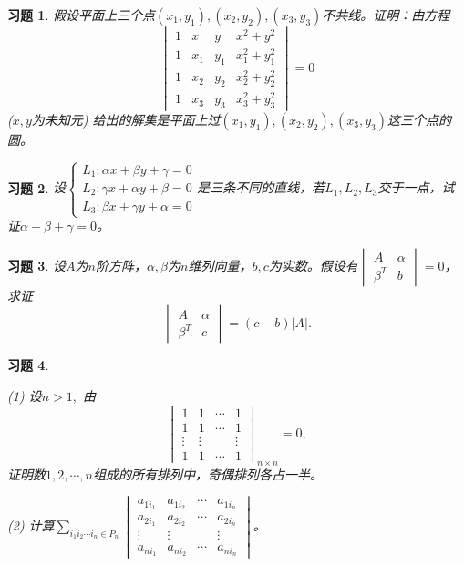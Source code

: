\documentclass[a4paper]{book}
\newtheorem{ex}{习题}[chapter]
\newcommand{\enum}{\begin{list}{}{\setlength{\leftmargin}{0pt} \setlength{\itemindent}{2.5em} \setlength{\listparindent}{2em}}}
\begin{document}
\begin{ex} \label{ex:2.19}
假设平面上三个点$(x_1, y_1), (x_2, y_2), (x_3, y_3)$不共线。证明：由方程
 $$\begin{vmatrix} 1 & x & y & x^2 + y^2 \\ 1 & x_1 & y_1 & x_1^2 + y_1^2 \\ 1 & x_2 & y_2 & x_2^2 + y_2^2 \\ 1 & x_3 & y_3 & x_3^2 + y_3^2 \end{vmatrix} = 0$$ ($x,y$为未知元) 给出的解集是平面上过$(x_1, y_1), (x_2, y_2), (x_3, y_3)$这三个点的圆。
\end{ex}

\begin{ex} \label{ex:2.20}
设$\left\{ \begin{array}{rcl} L_1: \alpha x + \beta y + \gamma = 0 \\ L_2: \gamma x + \alpha y + \beta = 0 \\ L_3: \beta x + \gamma y + \alpha = 0\end{array}\right.$是三条不同的直线，若$L_1, L_2, L_3$交于一点，试证$\alpha + \beta + \gamma = 0$。
\end{ex}

\begin{ex} \label{ex:2.21}
设$A$为$n$阶方阵，$\alpha,\beta$为$n$维列向量，$b,c$为实数。假设有$\begin{vmatrix} A & \alpha \\ \beta^T & b \end{vmatrix} = 0$，求证$$\begin{vmatrix} A & \alpha \\ \beta^T & c \end{vmatrix} = (c-b)|A|.$$
\end{ex}

\begin{ex}\ \label{ex:2.22}

\enum
\item[(1)] 设$n > 1,$ 由
$$\begin{vmatrix} 1 & 1 & \cdots & 1 \\ 1 & 1 & \cdots & 1 \\ \vdots & \vdots &  & \vdots \\ 1 & 1 & \cdots & 1 \end{vmatrix}_{n\times n} = 0,$$
证明数$1,2,\cdots,n$组成的所有排列中，奇偶排列各占一半。

\item[(2)] 计算$\sum\limits_{i_1i_2\cdots i_n\in P_n} \begin{vmatrix} a_{1i_1} & a_{1i_2} & \cdots & a_{1i_n} \\ a_{2i_1} & a_{2i_2} & \cdots & a_{2i_n} \\ \vdots & \vdots &  & \vdots \\ a_{ni_1} & a_{ni_2} & \cdots & a_{ni_n} \end{vmatrix}$。
\end{list}
\end{ex}
\end{document}
